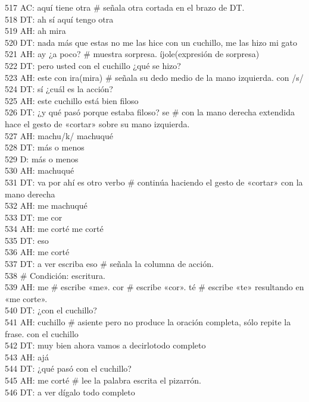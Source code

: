 517 AC: aquí tiene otra # señala otra cortada en el brazo de DT.\\
518 DT: ah sí aquí tengo otra\\
519 AH: ah mira\\
520 DT: nada más que estas no me las hice con un cuchillo, me las hizo mi gato\\
521 AH: ay ¿a poco? # muestra sorpresa. íjole(expresión de sorpresa)\\
522 DT: pero usted con el cuchillo ¿qué se hizo?\\
523 AH: este con ira(mira) # señala su dedo medio de la mano izquierda. con /s/\\
524 DT: sí ¿cuál es la acción?\\
525 AH: este cuchillo está bien filoso\\
526 DT: ¿y qué pasó porque estaba filoso? se # con la mano derecha extendida hace el gesto de «cortar» sobre su mano izquierda.\\
527 AH: machu/k/ machuqué\\
528 DT: más o menos\\
529 D: más o menos\\
530 AH: machuqué\\
531 DT: va por ahí es otro verbo # continúa haciendo el gesto de «cortar» con la mano derecha\\
532 AH: me machuqué\\
533 DT: me cor\\
534 AH: me corté me corté\\
535 DT: eso\\
536 AH: me corté\\
537 DT: a ver escriba eso # señala la columna de acción.\\
538 # Condición: escritura.\\
539 AH: me # escribe «me». cor # escribe «cor». té # escribe «te» resultando en «me corte».\\
540 DT: ¿con el cuchillo?\\
541 AH: cuchillo # asiente pero no produce la oración completa, sólo repite la frase. con el cuchillo\\
542 DT: muy bien ahora vamos a decirlotodo completo\\
543 AH: ajá\\
544 DT: ¿qué pasó con el cuchillo?\\
545 AH: me corté # lee la palabra escrita el pizarrón.\\
546 DT: a ver dígalo todo completo\\

